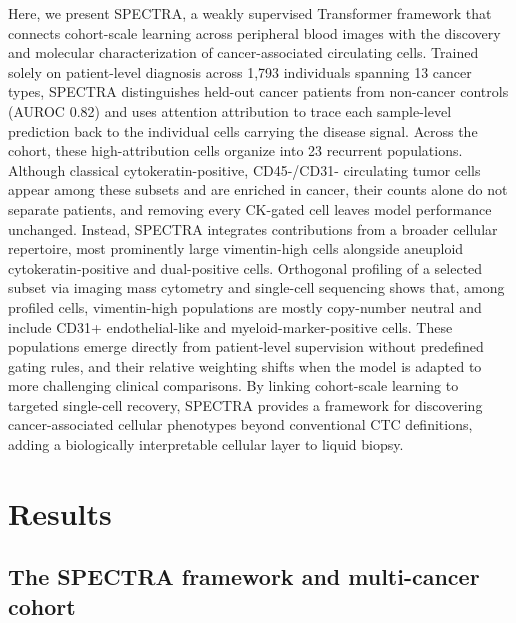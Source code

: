 \documentclass[11pt]{article}
\begin{document}
Here, we present SPECTRA, a weakly supervised Transformer framework that connects cohort-scale learning across peripheral blood images with the discovery and molecular characterization of cancer-associated circulating cells. Trained solely on patient-level diagnosis across 1,793 individuals spanning 13 cancer types, SPECTRA distinguishes held-out cancer patients from non-cancer controls (AUROC 0.82) and uses attention attribution to trace each sample-level prediction back to the individual cells carrying the disease signal. Across the cohort, these high-attribution cells organize into 23 recurrent populations. Although classical cytokeratin-positive, CD45-/CD31- circulating tumor cells appear among these subsets and are enriched in cancer, their counts alone do not separate patients, and removing every CK-gated cell leaves model performance unchanged. Instead, SPECTRA integrates contributions from a broader cellular repertoire, most prominently large vimentin-high cells alongside aneuploid cytokeratin-positive and dual-positive cells. Orthogonal profiling of a selected subset via imaging mass cytometry and single-cell sequencing shows that, among profiled cells, vimentin-high populations are mostly copy-number neutral and include CD31+ endothelial-like and myeloid-marker-positive cells. These populations emerge directly from patient-level supervision without predefined gating rules, and their relative weighting shifts when the model is adapted to more challenging clinical comparisons. By linking cohort-scale learning to targeted single-cell recovery, SPECTRA provides a framework for discovering cancer-associated cellular phenotypes beyond conventional CTC definitions, adding a biologically interpretable cellular layer to liquid biopsy.

\section*{Results}

\subsection*{The SPECTRA framework and multi-cancer cohort}
\end{document}
